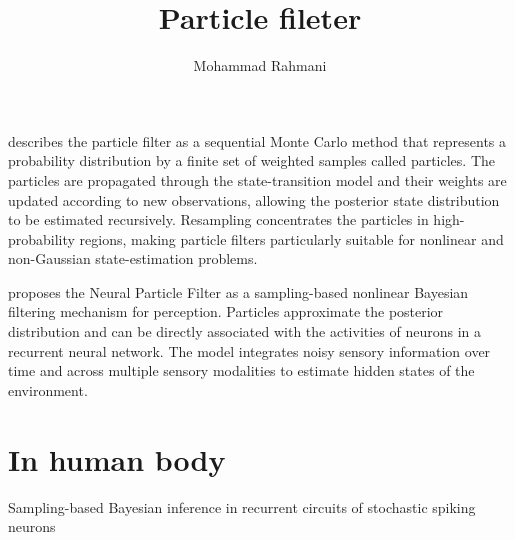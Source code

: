 \documentclass[a4paper]{article}
\title{Particle fileter}
\date{}
\author{Mohammad Rahmani}
\begin{document}
    \maketitle
    \cite{arulampalam-2002-a-tutorial-on-particle-filters-for-online-nonlinear-non-gaussian-bayesian-tracking} describes the particle filter as a sequential Monte Carlo method that represents a probability distribution by a finite set of weighted samples called particles. The particles are propagated through the state-transition model and their weights are updated according to new observations, allowing the posterior state distribution to be estimated recursively. Resampling concentrates the particles in high-probability regions, making particle filters particularly suitable for nonlinear and non-Gaussian state-estimation problems.
    
    \cite{kutschireiter-2017-nonlinear-bayesian-filtering-and-learning-a-neuronal-dynamics-for-perception} proposes the Neural Particle Filter as a sampling-based nonlinear Bayesian filtering mechanism for perception. Particles approximate the posterior distribution and can be directly associated with the activities of neurons in a recurrent neural network. The model integrates noisy sensory information over time and across multiple sensory modalities to estimate hidden states of the environment.
    
    \section{In human body}
        Sampling-based Bayesian inference in recurrent circuits of stochastic spiking neurons 
        
        
\end{document}
